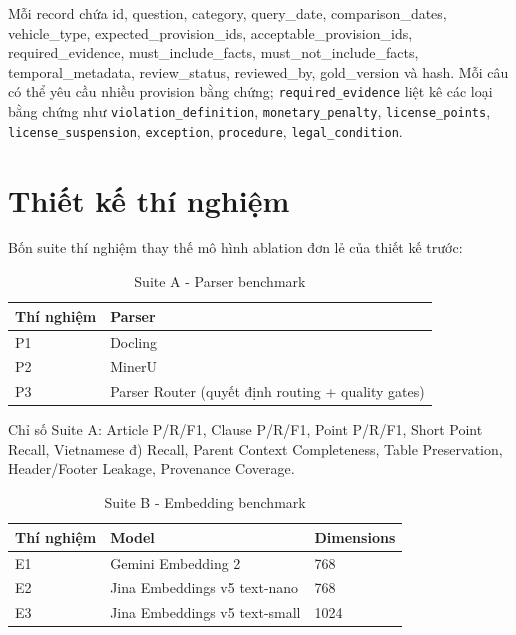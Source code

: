 \documentclass[a4paper,12pt]{extreport}
\newcommand{\code}[1]{\texttt{#1}}
\begin{document}
\begin{sloppypar}
Mỗi record chứa id, question, category, query\_date, comparison\_dates, vehicle\_type, expected\_provision\_ids, acceptable\_provision\_ids, required\_evidence, must\_include\_facts, must\_not\_include\_facts, temporal\_metadata, review\_status, reviewed\_by, gold\_version và hash. Mỗi câu có thể yêu cầu nhiều provision bằng chứng; \code{required\_evidence} liệt kê các loại bằng chứng như \code{violation\_definition}, \code{monetary\_penalty}, \code{license\_points}, \code{license\_suspension}, \code{exception}, \code{procedure}, \code{legal\_condition}.
\end{sloppypar}

\section{Thiết kế thí nghiệm}

Bốn suite thí nghiệm thay thế mô hình ablation đơn lẻ của thiết kế trước:

\begin{table}[H]
\caption{Suite A - Parser benchmark}
\small
\begin{tabularx}{\textwidth}{p{1.2cm}Y}
\toprule
\textbf{Thí nghiệm} & \textbf{Parser}\\
\midrule
P1 & Docling\\
P2 & MinerU\\
P3 & Parser Router (quyết định routing + quality gates)\\
\bottomrule
\end{tabularx}
\end{table}

Chỉ số Suite A: Article P/R/F1, Clause P/R/F1, Point P/R/F1, Short Point Recall, Vietnamese đ) Recall, Parent Context Completeness, Table Preservation, Header/Footer Leakage, Provenance Coverage.

\begin{table}[H]
\caption{Suite B - Embedding benchmark}
\small
\begin{tabularx}{\textwidth}{p{1.2cm}p{6.0cm}p{3.0cm}}
\toprule
\textbf{Thí nghiệm} & \textbf{Model} & \textbf{Dimensions}\\
\midrule
E1 & Gemini Embedding 2 & 768\\
E2 & Jina Embeddings v5 text-nano & 768\\
E3 & Jina Embeddings v5 text-small & 1024\\
\bottomrule
\end{tabularx}
\end{table}
\end{document}
